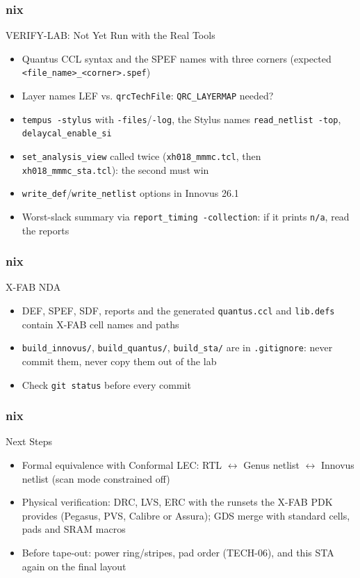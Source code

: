 \documentclass{beamer}
\newcommand{\astitle}{nix}
\newcommand{\assubtitle}{nix}
\newcommand{\cmd}[1]{\texttt{#1}}
\begin{document}
\renewcommand{\assubtitle}{VERIFY-LAB: Not Yet Run with the Real Tools}
\begin{frame}
\frametitle{\astitle}
\begin{block}{\assubtitle}
  \begin{itemize}
    \item Quantus CCL syntax and the SPEF names with three corners
      (expected \cmd{<file\_name>\_<corner>.spef})
    \item Layer names LEF vs. \cmd{qrcTechFile}: \cmd{QRC\_LAYERMAP}
      needed?
    \item \cmd{tempus -stylus} with \cmd{-files}/\cmd{-log}, the Stylus
      names \cmd{read\_netlist -top}, \cmd{delaycal\_enable\_si}
    \item \cmd{set\_analysis\_view} called twice (\cmd{xh018\_mmmc.tcl},
      then \cmd{xh018\_mmmc\_sta.tcl}): the second must win
    \item \cmd{write\_def}/\cmd{write\_netlist} options in Innovus 26.1
    \item Worst-slack summary via \cmd{report\_timing -collection}: if it
      prints \cmd{n/a}, read the reports
  \end{itemize}
\end{block}
\end{frame}

\renewcommand{\assubtitle}{X-FAB NDA}
\begin{frame}
\frametitle{\astitle}
\begin{block}{\assubtitle}
  \begin{itemize}
    \item DEF, SPEF, SDF, reports and the generated \cmd{quantus.ccl} and
      \cmd{lib.defs} contain X-FAB cell names and paths
    \item \cmd{build\_innovus/}, \cmd{build\_quantus/}, \cmd{build\_sta/}
      are in \cmd{.gitignore}: never commit them, never copy them out of
      the lab
    \item Check \cmd{git status} before every commit
  \end{itemize}
\end{block}
\end{frame}

\renewcommand{\assubtitle}{Next Steps}
\begin{frame}
\frametitle{\astitle}
\begin{block}{\assubtitle}
  \begin{itemize}
    \item Formal equivalence with Conformal LEC: RTL $\leftrightarrow$
      Genus netlist $\leftrightarrow$ Innovus netlist (scan mode
      constrained off)
    \item Physical verification: DRC, LVS, ERC with the runsets the
      X-FAB PDK provides (Pegasus, PVS, Calibre or Assura); GDS merge
      with standard cells, pads and SRAM macros
    \item Before tape-out: power ring/stripes, pad order (TECH-06), and
      this STA again on the final layout
  \end{itemize}
\end{block}
\end{frame}
\end{document}
